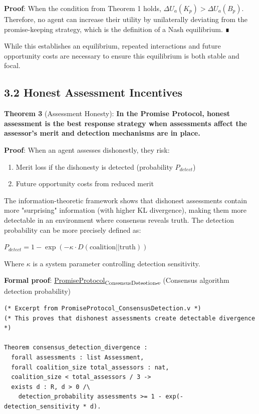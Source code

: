 \documentclass[11pt]{article}
\begin{document}
\textbf{Proof}: When the condition from Theorem 1 holds, \(\Delta U_a(K_p) > \Delta U_a(B_p)\). Therefore, no agent can increase their utility by unilaterally deviating from the promise-keeping strategy, which is the definition of a Nash equilibrium. ∎

While this establishes an equilibrium, repeated interactions and future opportunity costs are necessary to ensure this equilibrium is both stable and focal.
\subsection{3.2 Honest Assessment Incentives}
\label{sec:org26862e1}
\textbf{Theorem 3} (Assessment Honesty): \textbf{In the Promise Protocol, honest assessment is the best response strategy when assessments affect the assessor's merit and detection mechanisms are in place.}

\textbf{Proof}:
When an agent assesses dishonestly, they risk:
\begin{enumerate}
\item Merit loss if the dishonesty is detected (probability \(P_{detect}\))
\item Future opportunity costs from reduced merit
\end{enumerate}

The information-theoretic framework shows that dishonest assessments contain more "surprising" information (with higher KL divergence), making them more detectable in an environment where consensus reveals truth. The detection probability can be more precisely defined as:

\(P_{detect} = 1 - \exp(-\kappa \cdot D(\text{coalition}||\text{truth}))\)

Where \(\kappa\) is a system parameter controlling detection sensitivity.

\textbf{Formal proof}: \href{../coq/PromiseProtocol\_ConsensusDetection.v}{PromiseProtocol\textsubscript{ConsensusDetection.v}} (Consensus algorithm detection probability)

\begin{verbatim}
(* Excerpt from PromiseProtocol_ConsensusDetection.v *)
(* This proves that dishonest assessments create detectable divergence *)

Theorem consensus_detection_divergence :
  forall assessments : list Assessment,
  forall coalition_size total_assessors : nat,
  coalition_size < total_assessors / 3 ->
  exists d : R, d > 0 /\
    detection_probability assessments >= 1 - exp(-detection_sensitivity * d).
\end{verbatim}
\end{document}
